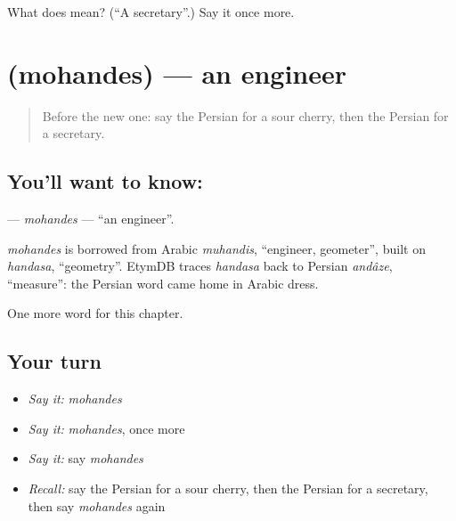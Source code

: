 \begin{tcolorbox}[breakable,colback=teal!4,colframe=teal!35!black,title={Before you move on}]
What does  mean? (\textquotedblleft{}A secretary\textquotedblright{}.) Say it once more.
\end{tcolorbox}
\section[\texorpdfstring{\fa{مهندس} (mohandes)}{مهندس (mohandes)}]{ (mohandes) — an engineer}

\label{lesson:FA-C250-mohandes}



\begin{quote}
Before the new one: say the Persian for a sour cherry, then the Persian for a secretary.
\end{quote}

\subsection*{You'll want to know: }
\textbf{} — \emph{mohandes} — \textquotedblleft{}an engineer\textquotedblright{}.

\begin{cousinweb}
\emph{mohandes} is borrowed from Arabic \emph{muhandis}, \textquotedblleft{}engineer, geometer\textquotedblright{}, built on \emph{handasa}, \textquotedblleft{}geometry\textquotedblright{}. EtymDB traces \emph{handasa} back to Persian \emph{andâze}, \textquotedblleft{}measure\textquotedblright{}: the Persian word came home in Arabic dress.
\end{cousinweb}

\begin{grammarlens}[title={What you've built}]
One more word for this chapter.
\end{grammarlens}

\subsection*{Your turn}
\begin{itemize}
\raggedright
  \item \emph{Say it:} \emph{mohandes}
  \item \emph{Say it:} \emph{mohandes}, once more
  \item \emph{Say it:} say \emph{mohandes}
  \item \emph{Recall:} say the Persian for a sour cherry, then the Persian for a secretary, then say \emph{mohandes} again
\end{itemize}

